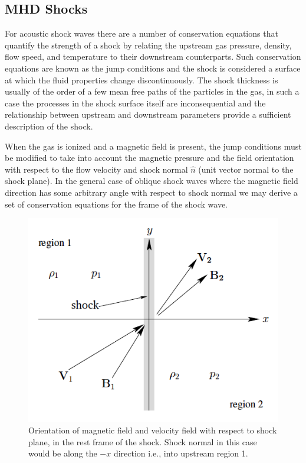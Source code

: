 \subsection{MHD Shocks}\label{sec:14}

For acoustic shock waves there are a number of conservation equations that quantify the strength of a shock by relating the upstream gas pressure, density, flow speed, and temperature to their downstream counterparts. Such conservation equations are known as the jump conditions and the shock is considered a surface at which the fluid properties change discontinuously. The shock thickness is usually of the order of a few mean free paths of the particles in the gas, in such a case the processes in the shock surface itself are inconsequential and the relationship between upstream and downstream parameters provide a sufficient description of the shock. 

When the gas is ionized and a magnetic field is present, the jump conditions must be modified to take into account the magnetic pressure and the field orientation with respect to the flow velocity and shock normal $\hat{n}$ (unit vector normal to the shock plane). In the general case of oblique shock waves where the magnetic field direction has some arbitrary angle with respect to shock normal we may derive a set of conservation equations for the frame of the shock wave. 
\begin{figure}[h!]
\begin{center}
\includegraphics[scale=0.5, angle=0]{images/shock_pic}
\caption[MHD shock framework]{Orientation of magnetic field and velocity field with respect to shock plane, in the rest frame of the shock. Shock normal in this case would be along the $-x$ direction i.e., into upstream region 1. \citep{fitz}}
\label{fig:shock_pic}
\end{center}
\end{figure}

